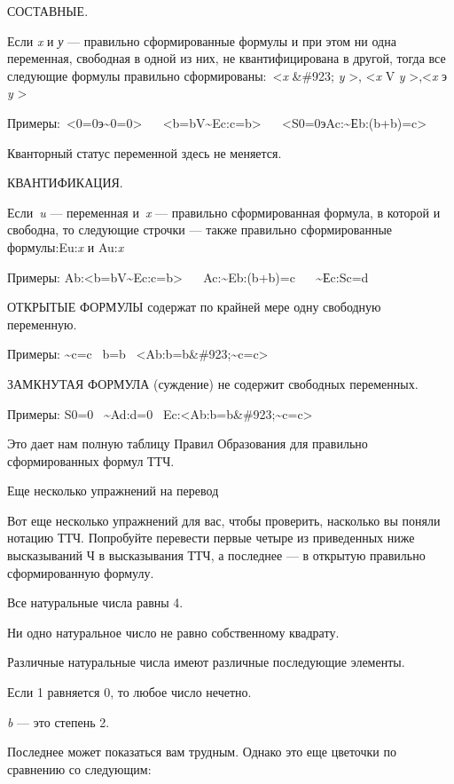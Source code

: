 \documentclass[../main.tex]{subfiles}
\begin{document}
СОСТАВНЫЕ.

Если \emph{x} и \emph{у} --- правильно сформированные формулы и при этом ни одна переменная, свободная в одной из них, не квантифицирована в другой, тогда все следующие формулы правильно сформированы:~\textless{}\emph{x} \&\#923; \emph{y} \textgreater, \textless{}\emph{x} V \emph{y} \textgreater,\textless{}\emph{x} э \emph{y} \textgreater{}

Примеры:~\textless0=0э\textasciitilde0=0\textgreater{} ~~ \textless b=bV\textasciitilde Ec:c=b\textgreater{} ~~ \textless S0=0эAc:\textasciitilde Еb:(b+b)=c\textgreater{}

Кванторный статус переменной здесь не меняется.

КВАНТИФИКАЦИЯ.

Если~\emph{u} --- переменная и~\emph{x} --- правильно сформированная формула, в которой и свободна, то следующие строчки --- также правильно сформированные формулы:Eu:\emph{x} и Au:\emph{x}

Примеры: Ab:\textless b=bV\textasciitilde Ec:c=b\textgreater{} ~~ Ac:\textasciitilde Eb:(b+b)=c ~~ \textasciitilde Еc:Sc=d

ОТКРЫТЫЕ ФОРМУЛЫ содержат по крайней мере одну свободную переменную.

Примеры: \textasciitilde c=c ~b=b~ \textless Ab:b=b\&\#923;\textasciitilde c=c\textgreater{}

ЗАМКНУТАЯ ФОРМУЛА (суждение) не содержит свободных переменных.

Примеры: S0=0~ \textasciitilde Ad:d=0~ Ec:\textless Ab:b=b\&\#923;\textasciitilde c=c\textgreater{}

Это дает нам полную таблицу Правил Образования для правильно сформированных формул ТТЧ.

Еще несколько упражнений на перевод

Вот еще несколько упражнений для вас, чтобы проверить, насколько вы поняли нотацию ТТЧ. Попробуйте перевести первые четыре из приведенных ниже высказываний Ч в высказывания ТТЧ, а последнее --- в открытую правильно сформированную формулу.

Все натуральные числа равны 4.

Ни одно натуральное число не равно собственному квадрату.

Различные натуральные числа имеют различные последующие элементы.

Если 1 равняется 0, то любое число нечетно.

\emph{b} --- это степень 2.

Последнее может показаться вам трудным. Однако это еще цветочки по сравнению со следующим:
\end{document}
